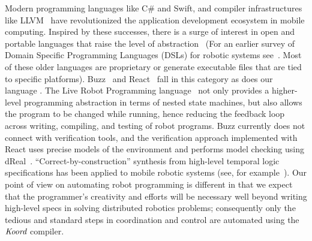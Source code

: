 Modern programming languages like C\# and Swift, and   compiler infrastructures like LLVM~\cite{llvm} have revolutionized the application development ecosystem in mobile computing.
Inspired by these successes, there is a surge of interest in open and portable languages that raise the level of abstraction~\cite{Buzzlanguage,Bohrer:2018:VVC:3192366.3192406,reactlang,williams2003model} (For an earlier survey of Domain Specific Programming Languages (DSLs) for robotic systems see~\cite{Nordmann2014}. Most of these older languages are proprietary or generate executable files that are tied to specific platforms).
%
Buzz~\cite{Buzzlanguage} and React~\cite{reactlang} fall in this category as does our language \lgname.
The Live Robot Programming language~\cite{campusanofabry:lrp2016} not only provides a higher-level programming abstraction in terms of nested state machines, but also allows the program to be changed while running, hence reducing the feedback loop across writing, compiling, and testing of robot programs.
Buzz currently does not  connect with  verification tools, and the verification approach implemented with React uses precise models of the environment and performs model checking using dReal~\cite{Gao2013}.
%
%
%
%
``Correct-by-construction'' synthesis from high-level temporal logic specifications has been applied to mobile robotic systems (see, for example~\cite{kress2009temporal,kloetzer2008fully,wongpiromsarn2010receding,wongpiromsarn2011tulip,ulusoy2013optimality}).
Our point of view on automating robot programming is different in that we expect that the programmer's creativity and efforts will be necessary well beyond writing high-level specs in solving distributed robotics problems; consequently only the tedious and standard steps in coordination and control are automated using the $\emph{Koord}$ compiler.

